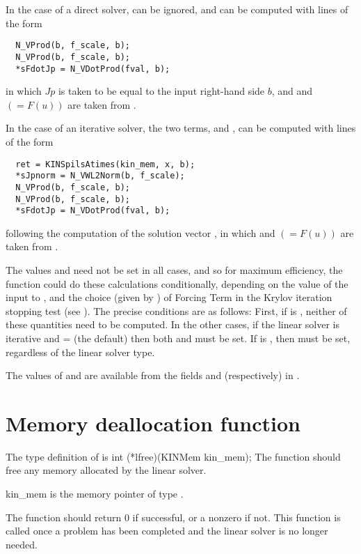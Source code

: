In the case of a direct solver,  can be ignored, and
 can be computed with lines of the form
\vspace{-.1in}
  \begin{verbatim}
  N_VProd(b, f_scale, b);
  N_VProd(b, f_scale, b);
  *sFdotJp = N_VDotProd(fval, b);
  \end{verbatim}
\vspace{-.2in}
in which $Jp$ is taken to be equal to the input right-hand side $b$,
and  and  $(= F(u))$ are taken from .

In the case of an iterative solver, the two terms,  and
, can be computed with lines of the form
\vspace{-.1in}
  \begin{verbatim}
  ret = KINSpilsAtimes(kin_mem, x, b);
  *sJpnorm = N_VWL2Norm(b, f_scale);
  N_VProd(b, f_scale, b);
  N_VProd(b, f_scale, b);
  *sFdotJp = N_VDotProd(fval, b);
  \end{verbatim}
\vspace{-.2in}
following the computation of the solution vector , in which
 and  $(= F(u))$ are taken from .

The values  and  need not be set in all cases,
and so for maximum efficiency, the  function could do these
calculations conditionally, depending on the value of the input 
to , and the choice (given by ) of Forcing Term
in the Krylov iteration stopping test (see ).
The precise conditions are as follows:  First, if  is
, neither of these quantities need to be computed.
In the other cases, if the linear solver is iterative
and  =  (the default) then both
 and  must be set.  If  is
, then  must be set, regardless of
the linear solver type.

The values of  and  are available from the fields
 and  (respectively) in .


\section{Memory deallocation function}
The type definition of  is
{
  int (*lfree)(KINMem kin\_mem);
}
{
  The  function should free any memory allocated by the linear solver.
}
{
  \begin{args}
  \item[kin\_mem]
    is the {\kinsol} memory pointer of type .
  \end{args}
}
{
  The  function should return 0 if successful, or a nonzero
  if not.
}
{
  This function is called once a problem has been completed and the 
  linear solver is no longer needed.
}
